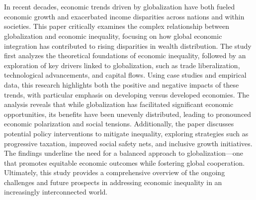 \chapter{\abstractname}
In recent decades, economic trends driven by globalization have both fueled economic growth and exacerbated income disparities across nations and within societies. This paper critically examines the complex relationship between globalization and economic inequality, focusing on how global economic integration has contributed to rising disparities in wealth distribution. The study first analyzes the theoretical foundations of economic inequality, followed by an exploration of key drivers linked to globalization, such as trade liberalization, technological advancements, and capital flows. Using case studies and empirical data, this research highlights both the positive and negative impacts of these trends, with particular emphasis on developing versus developed economies. The analysis reveals that while globalization has facilitated significant economic opportunities, its benefits have been unevenly distributed, leading to pronounced economic polarization and social tensions. Additionally, the paper discusses potential policy interventions to mitigate inequality, exploring strategies such as progressive taxation, improved social safety nets, and inclusive growth initiatives. The findings underline the need for a balanced approach to globalization—one that promotes equitable economic outcomes while fostering global cooperation. Ultimately, this study provides a comprehensive overview of the ongoing challenges and future prospects in addressing economic inequality in an increasingly interconnected world.











